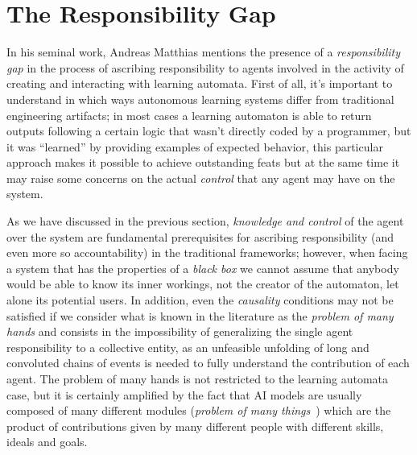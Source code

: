 \section{The Responsibility Gap}\label{sec:responsibilitygap}

In his seminal work, Andreas Matthias mentions the presence of a \textit{responsibility gap} \parencite{MATTRG} in the process of ascribing responsibility to agents involved in the activity of creating and interacting with learning automata.
First of all, it's important to understand in which ways autonomous learning systems differ from traditional engineering artifacts; in most cases a learning automaton is able to return outputs following a certain logic that wasn't directly coded by a programmer, but it was ``learned'' by providing examples of expected behavior, this particular approach makes it possible to achieve outstanding feats but at the same time it may raise some concerns on the actual \textit{control} that any agent may have on the system. 

As we have discussed in the previous section, \textit{knowledge and control} of the agent over the system are fundamental prerequisites for ascribing responsibility (and even more so accountability) in the traditional frameworks; however, when facing a system that has the properties of a \textit{black box} we cannot assume that anybody would be able to know its inner workings, not the creator of the automaton, let alone its potential users.
In addition, even the \textit{causality} conditions may not be satisfied if we consider what is known in the literature as the \textit{problem of many hands} \parencite{POPOM, COEAIR, NISAIA} and consists in the impossibility of generalizing the single agent responsibility to a collective entity, as an unfeasible unfolding of long and convoluted chains of events is needed to fully understand the contribution of each agent.
The problem of many hands is not restricted to the learning automata case, but it is certainly amplified by the fact that AI models are usually composed of many different modules (\textit{problem of many things}~\cite{COEAIR}) which are the product of contributions given by many different people with different skills, ideals and goals.